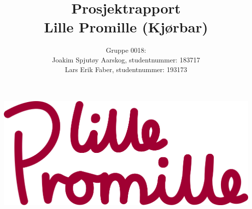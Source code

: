 \documentclass[12pt]{article}
\begin{document}
\title{%
    Prosjektrapport\\
    \large Lille Promille (Kjørbar)}
\author{
    Gruppe 0018:\\
    Joakim Spjutøy Aarskog, studentnummer: 183717\\
    Lars Erik Faber, studentnummer: 193173}
\date{}
\maketitle
\begin{center}
    \includegraphics[scale=2]{images/lille_promille_logo.png}
\end{center}
\thispagestyle{empty}
\newpage
{}
\tableofcontents
\thispagestyle{empty}
\newpage
\setcounter{page}{1}
















\end{document}
